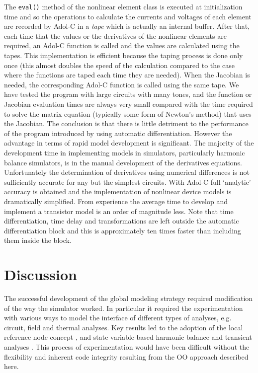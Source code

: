 The {\tt eval()} method of the nonlinear element class is executed at
initialization time and so the operations to calculate the currents
and voltages of each element are recorded by Adol-C in a \emph{tape}
which is actually an internal buffer. After that, each time that the
values or the derivatives of the nonlinear elements are required, an
Adol-C function is called and the values are calculated using the
tapes.  This implementation is efficient because the taping process is
done only once (this almost doubles the speed of the calculation
compared to the case where the functions are taped each time they are
needed).  When the Jacobian is needed, the corresponding Adol-C
function is called using the same tape. We have tested the program
with large circuits with many tones, and the function or Jacobian
evaluation times are always very small compared with the time required
to solve the matrix equation (typically some form of Newton's method)
that uses the Jacobian. The conclusion is that there is little
detriment to the performance of the program introduced by using
automatic differentiation.  However the advantage in terms of rapid
model development is significant.  The majority of the development
time in implementing models in simulators, particularly harmonic
balance simulators, is in the manual development of the derivatives
equations. Unfortunately the determination of derivatives using
numerical differences is not sufficiently accurate for any but the
simplest circuits. With Adol-C full `analytic' accuracy is obtained
and the implementation of nonlinear device models is dramatically
simplified. From experience the average time to develop and implement
a transistor model is an order of magnitude less. Note that time
differentiation, time delay and transformations are left outside the
automatic differentiation block and this is approximately ten times
faster than including them inside the block.



\section{Discussion}

The successful development of the global modeling strategy required
modification of the way the simulator worked.  In particular it
required the experimentation with various ways to model the interface
of different types of analyses, e.g. circuit, field and thermal
analyses.  Key results led to the adoption of the local reference node
concept
\cite{local:reference:node:christoffersen,local:reference:node:khalil},
and state variable-based harmonic balance and transient analyses
\cite{svtr,svhb}.  This process of experimentation would have been
difficult without the flexibility and inherent code integrity
resulting from the OO approach described here.

